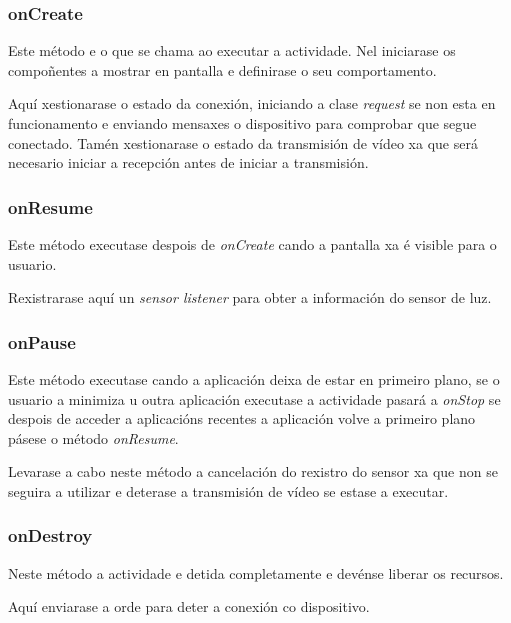 \subsubsection{onCreate}
Este método e o que se chama ao executar a actividade. Nel iniciarase os compoñentes a mostrar en pantalla e definirase o seu comportamento.

Aquí xestionarase o estado da conexión, iniciando a clase \emph{request} se non esta en funcionamento e enviando mensaxes o dispositivo para comprobar que segue conectado. Tamén xestionarase o estado da transmisión de vídeo xa que será necesario iniciar a recepción antes de iniciar a transmisión.
\subsubsection{onResume}
Este método executase despois de \emph{onCreate} cando a pantalla xa é visible para o usuario.

Rexistrarase aquí un \emph{sensor listener} para obter a información do sensor de luz.
\subsubsection{onPause}
Este método executase cando a aplicación deixa de estar en primeiro plano, se o usuario a minimiza u outra aplicación executase a actividade pasará a \emph{onStop} se despois de acceder a aplicacións recentes a aplicación volve a primeiro plano pásese o método \emph{onResume}.

Levarase a cabo neste método a cancelación do rexistro do sensor xa que non se seguira a utilizar e deterase a transmisión de vídeo se estase a executar.
\subsubsection{onDestroy}
Neste método a actividade e detida completamente e devénse liberar os recursos.

Aquí enviarase a orde para deter a conexión co dispositivo.

